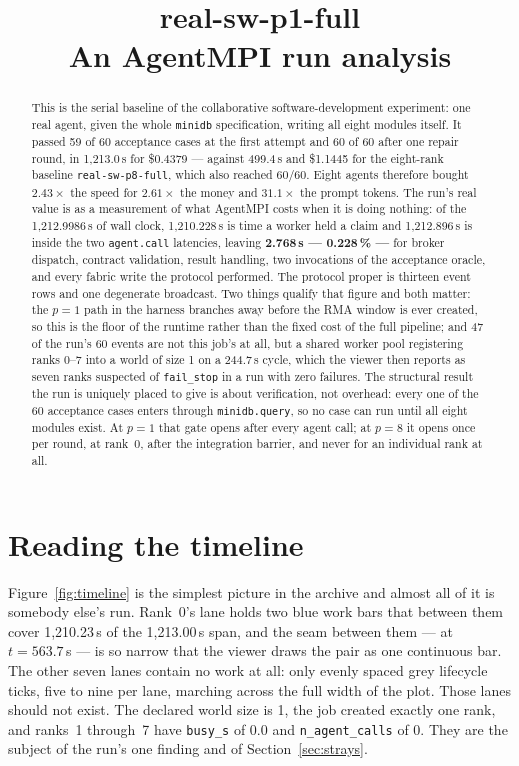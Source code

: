 \documentclass[11pt]{article}
\title{\textbf{real-sw-p1-full}\\[2pt]\large An AgentMPI run analysis}
\author{}
\date{}
\begin{document}
\maketitle

\begin{abstract}
This is the serial baseline of the collaborative software-development experiment: one real
agent, given the whole \texttt{minidb} specification, writing all eight modules itself. It
passed 59 of 60 acceptance cases at the first attempt and 60 of 60 after one repair round,
in 1{,}213.0\,s for \$0.4379 --- against 499.4\,s and \$1.1445 for the eight-rank baseline
\texttt{real-sw-p8-full}, which also reached 60/60. Eight agents therefore bought
$2.43\times$ the speed for $2.61\times$ the money and $31.1\times$ the prompt tokens. The run's
real value is as a measurement of what AgentMPI costs when it is doing nothing: of the
1{,}212.9986\,s of wall clock, 1{,}210.228\,s is time a worker held a claim and 1{,}212.896\,s
is inside the two \texttt{agent.call} latencies, leaving \textbf{2.768\,s --- 0.228\,\% ---} for
broker dispatch, contract validation, result handling, two invocations of the acceptance
oracle, and every fabric write the protocol performed. The protocol proper is thirteen event
rows and one degenerate broadcast. Two things qualify that figure and both matter: the $p=1$
path in the harness branches away before the RMA window is ever created, so this is the floor
of the runtime rather than the fixed cost of the full pipeline; and 47 of the run's 60 events
are not this job's at all, but a shared worker pool registering ranks 0--7 into a world of size
1 on a 244.7\,s cycle, which the viewer then reports as seven ranks suspected of
\texttt{fail\_stop} in a run with zero failures. The structural result the run is uniquely
placed to give is about verification, not overhead: every one of the 60 acceptance cases enters
through \texttt{minidb.query}, so no case can run until all eight modules exist. At $p=1$ that
gate opens after every agent call; at $p=8$ it opens once per round, at rank~0, after the
integration barrier, and never for an individual rank at all.
\end{abstract}



\section{Reading the timeline}

Figure~\ref{fig:timeline} is the simplest picture in the archive and almost all of it is
somebody else's run. Rank~0's lane holds two blue work bars that between them cover
1{,}210.23\,s of the 1{,}213.00\,s span, and the seam between them --- at $t=563.7$\,s --- is
so narrow that the viewer draws the pair as one continuous bar. The other seven lanes contain
no work at all: only evenly spaced grey lifecycle ticks, five to nine per lane, marching
across the full width of the plot. Those lanes should not exist. The declared world size is
1, the job created exactly one rank, and ranks~1 through~7 have \texttt{busy\_s} of 0.0 and
\texttt{n\_agent\_calls} of 0. They are the subject of the run's one  finding
and of Section~\ref{sec:strays}.
\end{document}
